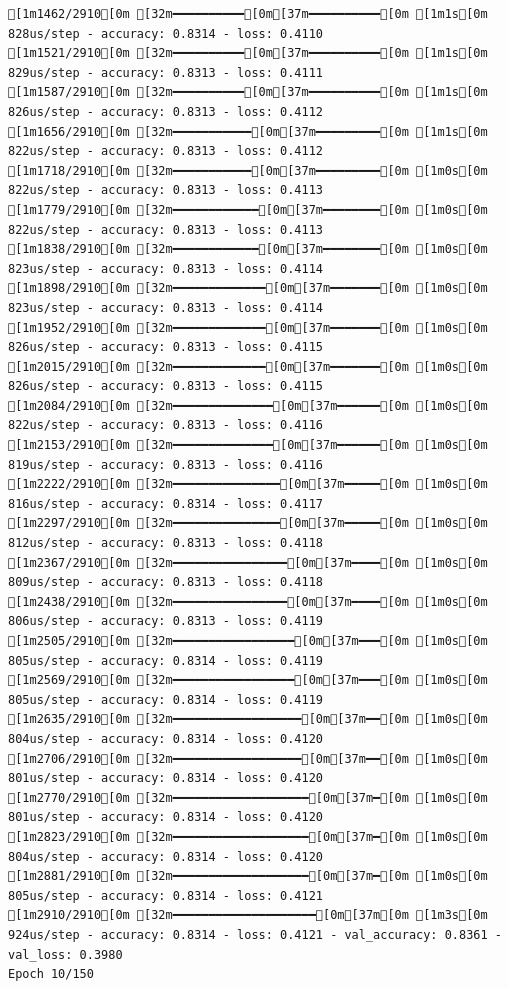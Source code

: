 \documentclass[
  letterpaper,
  DIV=11,
  numbers=noendperiod]{scrartcl}
\begin{document}
\begin{verbatim}
[1m1462/2910[0m [32m━━━━━━━━━━[0m[37m━━━━━━━━━━[0m [1m1s[0m 828us/step - accuracy: 0.8314 - loss: 0.4110
[1m1521/2910[0m [32m━━━━━━━━━━[0m[37m━━━━━━━━━━[0m [1m1s[0m 829us/step - accuracy: 0.8313 - loss: 0.4111
[1m1587/2910[0m [32m━━━━━━━━━━[0m[37m━━━━━━━━━━[0m [1m1s[0m 826us/step - accuracy: 0.8313 - loss: 0.4112
[1m1656/2910[0m [32m━━━━━━━━━━━[0m[37m━━━━━━━━━[0m [1m1s[0m 822us/step - accuracy: 0.8313 - loss: 0.4112
[1m1718/2910[0m [32m━━━━━━━━━━━[0m[37m━━━━━━━━━[0m [1m0s[0m 822us/step - accuracy: 0.8313 - loss: 0.4113
[1m1779/2910[0m [32m━━━━━━━━━━━━[0m[37m━━━━━━━━[0m [1m0s[0m 822us/step - accuracy: 0.8313 - loss: 0.4113
[1m1838/2910[0m [32m━━━━━━━━━━━━[0m[37m━━━━━━━━[0m [1m0s[0m 823us/step - accuracy: 0.8313 - loss: 0.4114
[1m1898/2910[0m [32m━━━━━━━━━━━━━[0m[37m━━━━━━━[0m [1m0s[0m 823us/step - accuracy: 0.8313 - loss: 0.4114
[1m1952/2910[0m [32m━━━━━━━━━━━━━[0m[37m━━━━━━━[0m [1m0s[0m 826us/step - accuracy: 0.8313 - loss: 0.4115
[1m2015/2910[0m [32m━━━━━━━━━━━━━[0m[37m━━━━━━━[0m [1m0s[0m 826us/step - accuracy: 0.8313 - loss: 0.4115
[1m2084/2910[0m [32m━━━━━━━━━━━━━━[0m[37m━━━━━━[0m [1m0s[0m 822us/step - accuracy: 0.8313 - loss: 0.4116
[1m2153/2910[0m [32m━━━━━━━━━━━━━━[0m[37m━━━━━━[0m [1m0s[0m 819us/step - accuracy: 0.8313 - loss: 0.4116
[1m2222/2910[0m [32m━━━━━━━━━━━━━━━[0m[37m━━━━━[0m [1m0s[0m 816us/step - accuracy: 0.8314 - loss: 0.4117
[1m2297/2910[0m [32m━━━━━━━━━━━━━━━[0m[37m━━━━━[0m [1m0s[0m 812us/step - accuracy: 0.8313 - loss: 0.4118
[1m2367/2910[0m [32m━━━━━━━━━━━━━━━━[0m[37m━━━━[0m [1m0s[0m 809us/step - accuracy: 0.8313 - loss: 0.4118
[1m2438/2910[0m [32m━━━━━━━━━━━━━━━━[0m[37m━━━━[0m [1m0s[0m 806us/step - accuracy: 0.8313 - loss: 0.4119
[1m2505/2910[0m [32m━━━━━━━━━━━━━━━━━[0m[37m━━━[0m [1m0s[0m 805us/step - accuracy: 0.8314 - loss: 0.4119
[1m2569/2910[0m [32m━━━━━━━━━━━━━━━━━[0m[37m━━━[0m [1m0s[0m 805us/step - accuracy: 0.8314 - loss: 0.4119
[1m2635/2910[0m [32m━━━━━━━━━━━━━━━━━━[0m[37m━━[0m [1m0s[0m 804us/step - accuracy: 0.8314 - loss: 0.4120
[1m2706/2910[0m [32m━━━━━━━━━━━━━━━━━━[0m[37m━━[0m [1m0s[0m 801us/step - accuracy: 0.8314 - loss: 0.4120
[1m2770/2910[0m [32m━━━━━━━━━━━━━━━━━━━[0m[37m━[0m [1m0s[0m 801us/step - accuracy: 0.8314 - loss: 0.4120
[1m2823/2910[0m [32m━━━━━━━━━━━━━━━━━━━[0m[37m━[0m [1m0s[0m 804us/step - accuracy: 0.8314 - loss: 0.4120
[1m2881/2910[0m [32m━━━━━━━━━━━━━━━━━━━[0m[37m━[0m [1m0s[0m 805us/step - accuracy: 0.8314 - loss: 0.4121
[1m2910/2910[0m [32m━━━━━━━━━━━━━━━━━━━━[0m[37m[0m [1m3s[0m 924us/step - accuracy: 0.8314 - loss: 0.4121 - val_accuracy: 0.8361 - val_loss: 0.3980
Epoch 10/150


\end{verbatim}
\end{document}
